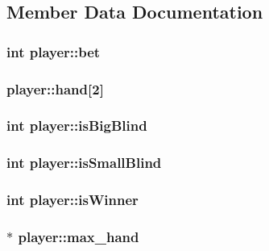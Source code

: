 \subsection{Member Data Documentation}
\hypertarget{structplayer_a0c5838d28a03958d82094cee91d73cd8}{
\subsubsection[{bet}]{\setlength{\rightskip}{0pt plus 5cm}int player\+::bet}}\label{structplayer_a0c5838d28a03958d82094cee91d73cd8}
\hypertarget{structplayer_a6da41d28aba13ce524b738fffc0fb058}{
\subsubsection[{hand}]{ player\+::hand\mbox{[}2\mbox{]}}}\label{structplayer_a6da41d28aba13ce524b738fffc0fb058}
\hypertarget{structplayer_aa29010f77b5955ef3a0d9cc59b13699a}{
\subsubsection[{is\+Big\+Blind}]{\setlength{\rightskip}{0pt plus 5cm}int player\+::is\+Big\+Blind}}\label{structplayer_aa29010f77b5955ef3a0d9cc59b13699a}
\hypertarget{structplayer_a00d758277154f5f7990db0f2d849586a}{
\subsubsection[{is\+Small\+Blind}]{\setlength{\rightskip}{0pt plus 5cm}int player\+::is\+Small\+Blind}}\label{structplayer_a00d758277154f5f7990db0f2d849586a}
\hypertarget{structplayer_ae3ed3af8f14bfaec499bac6ce8b6767f}{
\subsubsection[{is\+Winner}]{\setlength{\rightskip}{0pt plus 5cm}int player\+::is\+Winner}}\label{structplayer_ae3ed3af8f14bfaec499bac6ce8b6767f}
\hypertarget{structplayer_a6979113d7c6c0e8345962fb397c4bf06}{
\subsubsection[{max\+\_\+hand}]{$\ast$ player\+::max\+\_\+hand}}\label{structplayer_a6979113d7c6c0e8345962fb397c4bf06}

